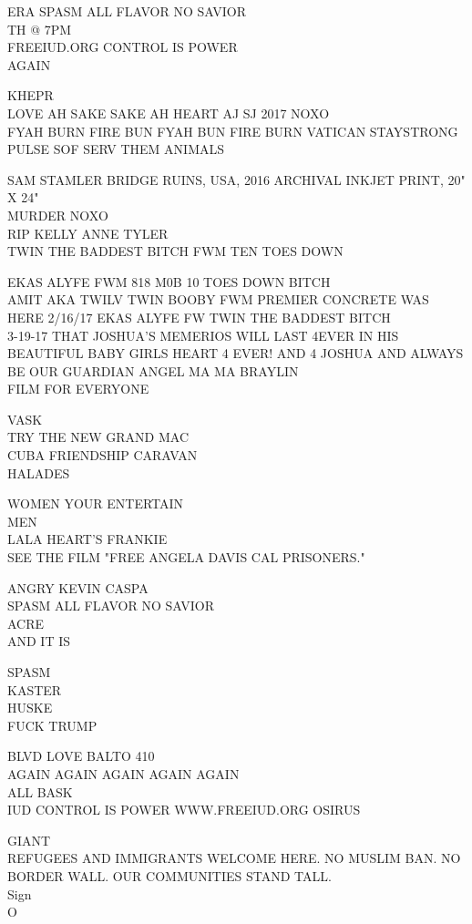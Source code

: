 \documentclass[10pt,letterpaper]{article}
\begin{document}
ERA SPASM ALL FLAVOR NO SAVIOR\\
TH @ 7PM\\
FREEIUD.ORG CONTROL IS POWER\\
AGAIN

KHEPR\\
LOVE AH SAKE SAKE AH HEART AJ SJ 2017 NOXO\\
FYAH BURN FIRE BUN FYAH BUN FIRE BURN VATICAN STAYSTRONG\\
PULSE SOF SERV THEM ANIMALS

SAM STAMLER BRIDGE RUINS, USA, 2016 ARCHIVAL INKJET PRINT, 20" X 24"\\
MURDER NOXO\\
RIP KELLY ANNE TYLER\\
TWIN THE BADDEST BITCH FWM TEN TOES DOWN

EKAS ALYFE FWM 818 M0B 10 TOES DOWN BITCH\\
AMIT AKA TWILV TWIN BOOBY FWM PREMIER CONCRETE WAS HERE 2/16/17 EKAS ALYFE FW TWIN THE BADDEST BITCH\\
3{-}19{-}17 THAT JOSHUA'S MEMERIOS WILL LAST 4EVER IN HIS BEAUTIFUL BABY GIRLS HEART 4 EVER!  AND 4 JOSHUA AND ALWAYS BE OUR GUARDIAN ANGEL MA MA BRAYLIN\\
FILM FOR EVERYONE

VASK\\
TRY THE NEW GRAND MAC\\
CUBA FRIENDSHIP CARAVAN\\
HALADES

WOMEN YOUR ENTERTAIN\\
MEN\\
LALA HEART'S FRANKIE\\
SEE THE FILM "FREE ANGELA DAVIS CAL PRISONERS."

ANGRY KEVIN CASPA\\
SPASM ALL FLAVOR NO SAVIOR\\
ACRE\\
AND IT IS

SPASM\\
KASTER\\
HUSKE\\
FUCK TRUMP

BLVD LOVE BALTO 410\\
AGAIN AGAIN AGAIN AGAIN AGAIN\\
ALL BASK\\
IUD CONTROL IS POWER WWW.FREEIUD.ORG OSIRUS

GIANT\\
REFUGEES AND IMMIGRANTS WELCOME HERE.  NO MUSLIM BAN.  NO BORDER WALL.  OUR COMMUNITIES STAND TALL.\\
Sign\\
O
\end{document}
